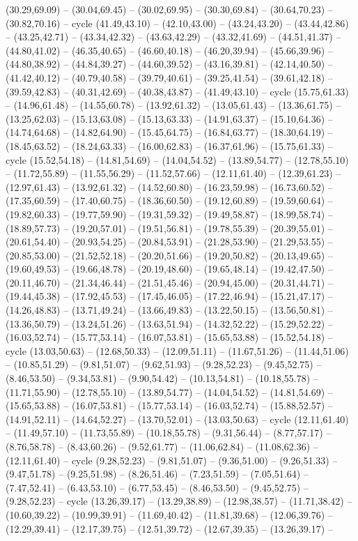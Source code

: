 {(30.29,69.09) -- (30.04,69.45) -- (30.02,69.95) -- (30.30,69.84) -- (30.64,70.23) -- (30.82,70.16) -- cycle (41.49,43.10) -- (42.10,43.00) -- (43.24,43.20) -- (43.44,42.86) -- (43.25,42.71) -- (43.34,42.32) -- (43.63,42.29) -- (43.32,41.69) -- (44.51,41.37) -- (44.80,41.02) -- (46.35,40.65) -- (46.60,40.18) -- (46.20,39.94) -- (45.66,39.96) -- (44.80,38.92) -- (44.84,39.27) -- (44.60,39.52) -- (43.16,39.81) -- (42.14,40.50) -- (41.42,40.12) -- (40.79,40.58) -- (39.79,40.61) -- (39.25,41.54) -- (39.61,42.18) -- (39.59,42.83) -- (40.31,42.69) -- (40.38,43.87) -- (41.49,43.10) -- cycle (15.75,61.33) -- (14.96,61.48) -- (14.55,60.78) -- (13.92,61.32) -- (13.05,61.43) -- (13.36,61.75) -- (13.25,62.03) -- (15.13,63.08) -- (15.13,63.33) -- (14.91,63.37) -- (15.10,64.36) -- (14.74,64.68) -- (14.82,64.90) -- (15.45,64.75) -- (16.84,63.77) -- (18.30,64.19) -- (18.45,63.52) -- (18.24,63.33) -- (16.00,62.83) -- (16.37,61.96) -- (15.75,61.33) -- cycle (15.52,54.18) -- (14.81,54.69) -- (14.04,54.52) -- (13.89,54.77) -- (12.78,55.10) -- (11.72,55.89) -- (11.55,56.29) -- (11.52,57.66) -- (12.11,61.40) -- (12.39,61.23) -- (12.97,61.43) -- (13.92,61.32) -- (14.52,60.80) -- (16.23,59.98) -- (16.73,60.52) -- (17.35,60.59) -- (17.40,60.75) -- (18.36,60.50) -- (19.12,60.89) -- (19.59,60.64) -- (19.82,60.33) -- (19.77,59.90) -- (19.31,59.32) -- (19.49,58.87) -- (18.99,58.74) -- (18.89,57.73) -- (19.20,57.01) -- (19.51,56.81) -- (19.78,55.39) -- (20.39,55.01) -- (20.61,54.40) -- (20.93,54.25) -- (20.84,53.91) -- (21.28,53.90) -- (21.29,53.55) -- (20.85,53.00) -- (21.52,52.18) -- (20.20,51.66) -- (19.20,50.82) -- (20.13,49.65) -- (19.60,49.53) -- (19.66,48.78) -- (20.19,48.60) -- (19.65,48.14) -- (19.42,47.50) -- (20.11,46.70) -- (21.34,46.44) -- (21.51,45.46) -- (20.94,45.00) -- (20.31,44.71) -- (19.44,45.38) -- (17.92,45.53) -- (17.45,46.05) -- (17.22,46.94) -- (15.21,47.17) -- (14.26,48.83) -- (13.71,49.24) -- (13.66,49.83) -- (13.22,50.15) -- (13.56,50.81) -- (13.36,50.79) -- (13.24,51.26) -- (13.63,51.94) -- (14.32,52.22) -- (15.29,52.22) -- (16.03,52.74) -- (15.77,53.14) -- (16.07,53.81) -- (15.65,53.88) -- (15.52,54.18) -- cycle (13.03,50.63) -- (12.68,50.33) -- (12.09,51.11) -- (11.67,51.26) -- (11.44,51.06) -- (10.85,51.29) -- (9.81,51.07) -- (9.62,51.93) -- (9.28,52.23) -- (9.45,52.75) -- (8.46,53.50) -- (9.34,53.81) -- (9.90,54.42) -- (10.13,54.81) -- (10.18,55.78) -- (11.71,55.90) -- (12.78,55.10) -- (13.89,54.77) -- (14.04,54.52) -- (14.81,54.69) -- (15.65,53.88) -- (16.07,53.81) -- (15.77,53.14) -- (16.03,52.74) -- (15.88,52.57) -- (14.91,52.11) -- (14.64,52.27) -- (13.70,52.01) -- (13.03,50.63) -- cycle (12.11,61.40) -- (11.49,57.10) -- (11.73,55.89) -- (10.18,55.78) -- (9.31,56.44) -- (8.77,57.17) -- (8.76,58.78) -- (8.43,60.26) -- (9.52,61.77) -- (11.06,62.84) -- (11.08,62.36) -- (12.11,61.40) -- cycle (9.28,52.23) -- (9.81,51.07) -- (9.36,51.00) -- (9.26,51.33) -- (9.47,51.78) -- (9.25,51.98) -- (8.26,51.46) -- (7.23,51.59) -- (7.05,51.64) -- (7.47,52.41) -- (6.43,53.10) -- (6.77,53.45) -- (8.46,53.50) -- (9.45,52.75) -- (9.28,52.23) -- cycle (13.26,39.17) -- (13.29,38.89) -- (12.98,38.57) -- (11.71,38.42) -- (10.60,39.22) -- (10.99,39.91) -- (11.69,40.42) -- (11.81,39.68) -- (12.06,39.76) -- (12.29,39.41) -- (12.17,39.75) -- (12.51,39.72) -- (12.67,39.35) -- (13.26,39.17) -- }

